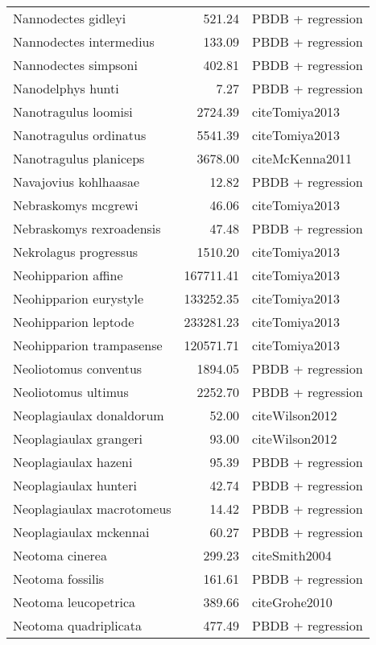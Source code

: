 \begin{table}[ht]
\begin{tabular}{lrl}
  Nannodectes gidleyi & 521.24 & PBDB + regression \\ 
  Nannodectes intermedius & 133.09 & PBDB + regression \\ 
  Nannodectes simpsoni & 402.81 & PBDB + regression \\ 
  Nanodelphys hunti & 7.27 & PBDB + regression \\ 
  Nanotragulus loomisi & 2724.39 & cite{Tomiya2013} \\ 
  Nanotragulus ordinatus & 5541.39 & cite{Tomiya2013} \\ 
  Nanotragulus planiceps & 3678.00 & cite{McKenna2011} \\ 
  Navajovius kohlhaasae & 12.82 & PBDB + regression \\ 
  Nebraskomys mcgrewi & 46.06 & cite{Tomiya2013} \\ 
  Nebraskomys rexroadensis & 47.48 & PBDB + regression \\ 
  Nekrolagus progressus & 1510.20 & cite{Tomiya2013} \\ 
  Neohipparion affine & 167711.41 & cite{Tomiya2013} \\ 
  Neohipparion eurystyle & 133252.35 & cite{Tomiya2013} \\ 
  Neohipparion leptode & 233281.23 & cite{Tomiya2013} \\ 
  Neohipparion trampasense & 120571.71 & cite{Tomiya2013} \\ 
  Neoliotomus conventus & 1894.05 & PBDB + regression \\ 
  Neoliotomus ultimus & 2252.70 & PBDB + regression \\ 
  Neoplagiaulax donaldorum & 52.00 & cite{Wilson2012} \\ 
  Neoplagiaulax grangeri & 93.00 & cite{Wilson2012} \\ 
  Neoplagiaulax hazeni & 95.39 & PBDB + regression \\ 
  Neoplagiaulax hunteri & 42.74 & PBDB + regression \\ 
  Neoplagiaulax macrotomeus & 14.42 & PBDB + regression \\ 
  Neoplagiaulax mckennai & 60.27 & PBDB + regression \\ 
  Neotoma cinerea & 299.23 & cite{Smith2004} \\ 
  Neotoma fossilis & 161.61 & PBDB + regression \\ 
  Neotoma leucopetrica & 389.66 & cite{Grohe2010} \\ 
  Neotoma quadriplicata & 477.49 & PBDB + regression \\ 

\end{tabular}
\end{table}
